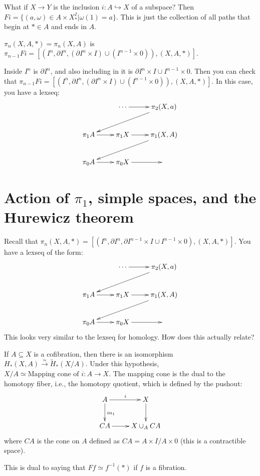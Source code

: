 What if $X\to Y$ is the inclusion $i:A\hookrightarrow X$ of a subspace? Then $Fi=\{(a,\omega)\in A\times X^I_\ast|\omega(1) = a\}$. This is just the collection of all paths that begin at $\ast\in A$ and ends in $A$.
\begin{definition}
    $\pi_n(X,A,\ast) = \pi_n(X,A)$ is $\pi_{n-1}Fi = [(I^n,\partial I^n,(\partial I^n\times I)\cup (I^{n-1}\times 0)),(X,A,\ast)]$.
\end{definition}
Inside $I^n$ is $\partial I^n$, and also including in it is $\partial I^n\times I\cup I^{n-1}\times 0$. Then you can check that $\pi_{n-1}Fi = [(I^n,\partial I^n,(\partial I^n\times I)\cup (I^{n-1}\times 0)),(X,A,\ast)]$. In this case, you have a lexseq: 
\begin{equation*}
    \xymatrix{
	& \cdots\ar[r] & \pi_2 (X,a)\ar[dll]\\
	\pi_1 A\ar[r] & \pi_1 X\ar[r] & \pi_1 (X,A)\ar[dll]\\
	\pi_0 A\ar[r] & \pi_0 X\ar[r] & 
    }
\end{equation*}
\section{Action of $\pi_1$, simple spaces, and the Hurewicz theorem}
Recall that $\pi_n(X,A,\ast) = [(I^n,\partial I^n,\partial I^{n-1}\times I\cup I^{n-1}\times 0),(X,A,\ast)]$. You have a lexseq of the form:
\begin{equation*}
    \xymatrix{
	& \cdots\ar[r] & \pi_2 (X,a)\ar[dll]\\
	\pi_1 A\ar[r] & \pi_1 X\ar[r] & \pi_1 (X,A)\ar[dll]\\
	\pi_0 A\ar[r] & \pi_0 X\ar[r] & 
    }
\end{equation*}
This looks very similar to the lexseq for homology. How does this actually relate?
\begin{lemma}[Excision]
    If $A\subseteq X$ is a cofibration, then there is an isomorphism $H_\ast(X,A)\xrightarrow{\simeq}\widetilde{H}_\ast(X/A)$. Under this hypothesis, $X/A\simeq\text{Mapping cone of }i:A\to X$. The mapping cone is the dual to the homotopy fiber, i.e., the homotopy quotient, which is defined by the pushout:
    \begin{equation*}
	\xymatrix{
	    A\ar[r]^i\ar[d]^{in_1} & X\ar[d]\\
	    CA\ar[r] & X\cup_A CA
	    }
    \end{equation*}
    where $CA$ is the cone on $A$ defined as $CA = A\times I/A\times 0$ (this is a contractible space).
\end{lemma}
This is dual to saying that $Ff\simeq f^{-1}(\ast)$ if $f$ is a fibration.

